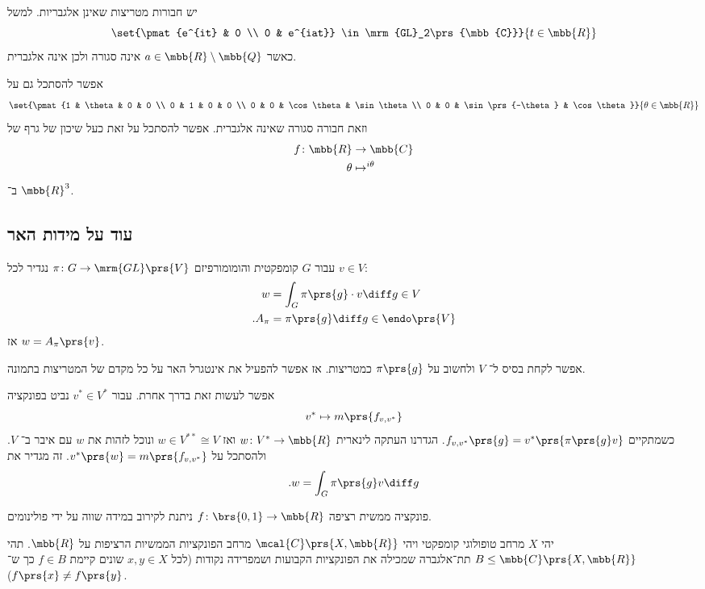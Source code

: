 \documentclass[10pt, twoside]{book}
\begin{document}
\begin{remark}
יש חבורות מטריצות שאינן אלגבריות.
למשל
\[\set{\pmat{e^{it} & 0 \\ 0 & e^{iat}} \in \mrm{GL}_2\prs{\mbb{C}}}{t \in \mbb{R}}\]
כאשר
$a \in \mbb{R} \setminus \mbb{Q}$
אינה סגורה ולכן אינה אלגברית.

אפשר להסתכל גם על
\[\set{\pmat{1 & \theta & 0 & 0 \\ 0 & 1 & 0 & 0 \\ 0 & 0 & \cos \theta & \sin \theta \\ 0 & 0 & \sin \prs{-\theta} & \cos \theta}}{\theta \in \mbb{R}}\]
וזאת חבורה סגורה שאינה אלגברית.
אפשר להסתכל על זאת כעל שיכון של גרף של
\begin{align*}
f \colon \mbb{R} &\to \mbb{C} \\
\theta &\mapsto^{i\theta}
\end{align*}
ב־%
$\mbb{R}^3$.
\end{remark}

\subsection{עוד על מידות האר}

עבור
$G$
קומפקטית והומומורפיזם
$\pi \colon G \to \mrm{GL}\prs{V}$
נגדיר לכל
$v \in V$:
\begin{align*}
w &= \int_G \pi\prs{g} \cdot v \diff g \in V \\
\text{.}A_\pi &= \pi\prs{g} \diff g \in \endo\prs{V}
\end{align*}
אז
$w = A_\pi\prs{v}$.

אפשר לקחת בסיס ל־%
$V$
ולחשוב על
$\pi\prs{g}$
כמטריצות. אז אפשר להפעיל את אינטגרל האר על כל מקדם של המטריצות בתמונה.


אפשר לעשות זאת בדרך אחרת.
עבור
$v^* \in V^*$
נביט בפונקציה
\[v^* \mapsto m\prs{f_{v,v^*}}\]
כשמתקיים
$f_{v,v^*}\prs{g} = v^*\prs{\pi\prs{g} v}$.
הגדרנו העתקה לינארית
$w \colon V^* \to \mbb{R}$
ואז
$w \in V^{**} \cong V$
ונוכל לזהות את
$w$
עם איבר ב־%
$V$.
ולהסתכל על
$v^*\prs{w} = m\prs{f_{v,v^*}}$.
זה מגדיר את
\[\text{.} w = \int_G \pi\prs{g} v \diff g\]

\begin{theorem}
פונקציה ממשית רציפה
$f \colon \brs{0,1} \to \mbb{R}$
ניתנת לקירוב במידה שווה על ידי פולינומים.
\end{theorem}

\begin{theorem}
יהי
$X$
מרחב טופולוגי קומפקטי ויהי
$\mcal{C}\prs{X,\mbb{R}}$
מרחב הפונקציות הממשיות הרציפות על
$\mbb{R}$.
תהי
$B \leq \mbb{C}\prs{X,\mbb{R}}$
תת־אלגברה שמכילה את הפונקציות הקבועות ושמפרידה נקודות (לכל $x,y \in X$ שונים קיימת $f \in B$ כך ש־%
$f\prs{x} \neq f\prs{y}$).
\end{theorem}
\end{document}
